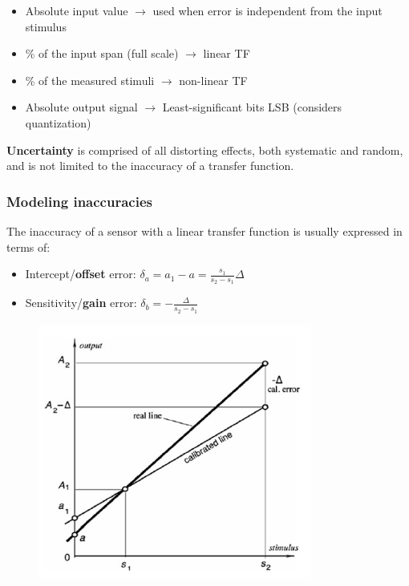 \begin{itemize}
    \item Absolute input value $\rightarrow$ used when error is independent
from the input stimulus
    \item \% of the input span (full scale) $\rightarrow$ linear TF
    \item \% of the measured stimuli $\rightarrow$ non-linear TF
    \item Absolute output signal $\rightarrow$ Least-significant bits LSB
(considers quantization)
\end{itemize}
\textbf{Uncertainty} is comprised of all distorting effects, both systematic and random,
and is not limited to the inaccuracy of a transfer function.


\subsubsection{Modeling inaccuracies}

\begin{minipage}[c]{.45\linewidth}	  
The inaccuracy of a
sensor with a linear
transfer function is
usually expressed
in terms of:

\begin{itemize}
    \item Intercept/\textbf{offset} error: $ \delta_a = a_1 - a = \frac{s_1}{s_2 - s_1} \Delta $
    \item Sensitivity/\textbf{gain} error: $ \delta_b = - \frac{\Delta}{s_2 - s_1} $
\end{itemize}

\end{minipage} \hfill
\begin{minipage}[c]{.45\linewidth}
   \begin{figure}[H]
    \centering
    \includegraphics[width = 0.8\textwidth]{L1/img/calibration-error.PNG}
\end{figure}

   \end{minipage}

